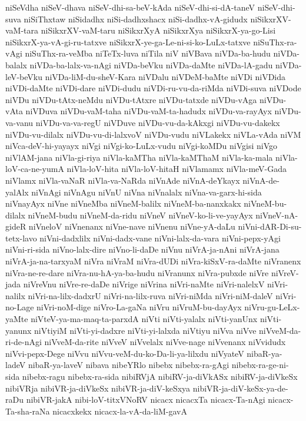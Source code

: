 {niSeVdha
niSeV-dhava
niSeV-dhi-sa-beV-kAda
niSeV-dhi-si-dA-taneV
niSeV-dhi-suva
niSiThxtaw
niSidadhx
niSi-dadhxshacx
niSi-dadhx-vA-gidudx
niSikxrXV-vaM-tara
niSikxrXV-vaM-taru
niSikxrXyA
niSikxrXya
niSikxrX-ya-go-Lisi
niSikxrX-ya-vA-gi-ru-tatxve
niSikxrX-ye-ga-Le-ni-si-ko-LuLx-tatxve
niSuThx-ra-vAgi
niSuThx-ra-veMba
niTeTx-luva
niTila
niV
niVBava
niVDa-ba-hudu
niVDa-balalx
niVDa-ba-lalx-va-nAgi
niVDa-beVku
niVDa-daMte
niVDa-lA-gadu
niVDa-leV-beVku
niVDa-liM-du-sheV-Kara
niVDalu
niVDeM-baMte
niVDi
niVDida
niVDi-daMte
niVDi-dare
niVDi-dudu
niVDi-ru-vu-da-riMda
niVDi-suva
niVDode
niVDu
niVDu-tAtx-neMdu
niVDu-tAtxre
niVDu-tatxde
niVDu-vAga
niVDu-vAta
niVDuva
niVDu-vaM-taha
niVDu-vaM-ta-hadudx
niVDu-va-rayAyx
niVDu-va-vanu
niVDu-va-va-regU
niVDuve
niVDu-vu-da-kAkxgi
niVDu-vu-dakekx
niVDu-vu-dilalx
niVDu-vu-di-lalxvoV
niVDu-vudu
niVLakekx
niVLa-vAda
niVM
niVca-deV-hi-yayayx
niVgi
niVgi-ko-LuLx-vudu
niVgi-koMDu
niVgisi
niVgo
niVlAM-jana
niVla-gi-riya
niVla-kaMTha
niVla-kaMThaM
niVla-ka-mala
niVla-loV-ca-ne-yumA
niVla-loV-hita
niVla-loV-hitaH
niVlamamx
niVla-meV-Gada
niVlamx
niVla-vaNaR
niVla-va-NaRda
niVnAde
niVnA-deYkayx
niVnA-de-yalAlx
niVnAgi
niVnAgu
niVnU
niVna
niVnalalx
niVna-va-garx-hi-sida
niVnayAyx
niVne
niVneMba
niVneM-balilx
niVneM-ba-nanxkakx
niVneM-bu-dilalx
niVneM-budu
niVneM-da-ridu
niVneV
niVneV-ko-li-ve-yayAyx
niVneV-nA-gideR
niVneloV
niVnenanx
niVne-nave
niVnenu
niVne-yA-daLu
niVni-dAR-Di-su-tetx-lavo
niVni-dadxlilx
niVni-dadx-vane
niVni-lalx-da-vara
niVni-pepx-yAgi
niVni-ri-sida
niVno-lalx-dire
niVno-li-daDe
niVnu
niVrA-ja-nAni
niVrA-jana
niVrA-ja-na-tarxyaM
niVra
niVraM
niVra-dUDi
niVra-kiSxV-ra-daMte
niVranenx
niVra-ne-re-dare
niVra-nu-hA-ya-ba-hudu
niVranunx
niVra-pubxde
niVre
niVreV-jada
niVreVnu
niVre-re-daDe
niVrige
niVrina
niVri-naMte
niVri-nalelxV
niVri-nalilx
niVri-na-lilx-dadxrU
niVri-na-lilx-ruva
niVri-niMda
niVri-niM-daleV
niVri-no-Lage
niVri-noM-dige
niVro-La-gaNa
niVru
niVruM-bu-dayAyx
niVru-gu-LeLx-yaMte
niVteV-ya-ma-maq-ta-parxdA
niVti
niVti-yalalx
niVti-yanUnx
niVti-yanunx
niVtiyiM
niVti-yi-dadxre
niVti-yi-lalxda
niVtiyu
niVva
niVve
niVveM-da-ri-de-nAgi
niVveM-da-rite
niVveV
niVvelalx
niVve-nage
niVvenanx
niVvidudx
niVvi-pepx-Dege
niVvu
niVvu-veM-du-ko-Da-li-ya-lilxdu
niVyateV
nibaR-ya-ladeV
nibaR-ya-laveV
nibava
nibeYRlo
nibebx
nibebx-ra-gAgi
nibebx-ra-ge-ni-sida
nibebx-ragu
nibebx-ra-sida
nibiRVjA
nibiRV-ja-diVkASx
nibiRV-ja-diVkeSx
nibiVRja
nibiVR-ja-diVkeSx
nibiVR-ja-diV-keSxya
nibiVR-ja-diV-keSx-ya-de-raDu
nibiVR-jakA
nibi-loV-titxVNoRV
nicacx
nicacxTa
nicacx-Ta-nAgi
nicacx-Ta-sha-raNa
nicacxkekx
nicacx-la-vA-da-liM-gavA
}
